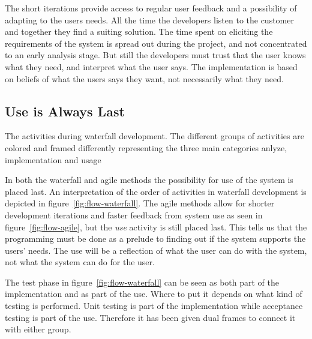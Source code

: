 \documentclass[a4paper]{report}
\begin{document}

The short iterations provide access to regular user feedback and a possibility of adapting to the users needs. All the time the developers listen to the customer and together they find a suiting solution. The time spent on eliciting the requirements of the system is spread out during the project, and not concentrated to an early analysis stage. But still the developers must trust that the user knows what they need, and interpret what the user says. The implementation is based on beliefs of what the users says they want, not necessarily what they need.

\subsection{Use is Always Last}
	{The activities during waterfall development. The different groups of activities are colored and framed differently representing the three main categories anlyze, implementation and usage}

\label{sec:use-is-last} In both the waterfall and agile methods the possibility for use of the system is placed last. An interpretation of the order of activities in waterfall development is depicted in figure~\ref{fig:flow-waterfall}. The agile methods allow for shorter development iterations and faster feedback from system use as seen in figure~\ref{fig:flow-agile}, but the \emph{use} activity is still placed last. This tells us that the programming must be done as a prelude to finding out if the system supports the users' needs. The use will be a reflection of what the user can do with the system, not what the system can do for the user.

The test phase in figure~\ref{fig:flow-waterfall} can be seen as both part of the implementation and as part of the use. Where to put it depends on what kind of testing is performed. Unit testing is part of the implementation while acceptance testing is part of the use. Therefore it has been given dual frames to connect it with either group.
\end{document}
